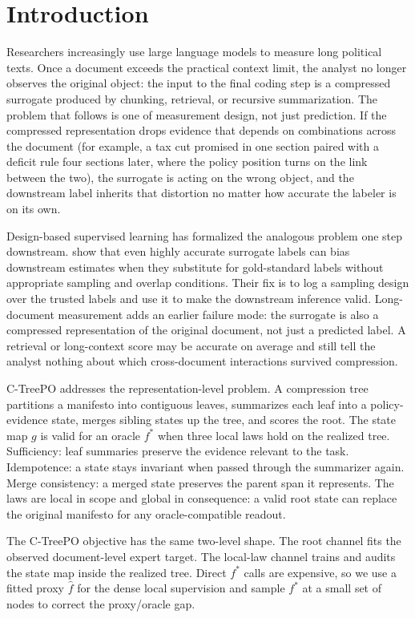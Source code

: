\section{Introduction}\label{sec:v8-introduction}

Researchers increasingly use large language models to measure long
political texts. Once a document exceeds the practical context
limit, the analyst no longer observes the original object: the
input to the final coding step is a compressed surrogate produced by
chunking, retrieval, or recursive summarization. The problem that
follows is one of measurement design, not just prediction. If the
compressed representation drops evidence that depends on combinations
across the document (for example, a tax cut promised in one section
paired with a deficit rule four sections later, where the policy
position turns on the link between the two), the surrogate is acting
on the wrong object, and the downstream label inherits that
distortion no matter how accurate the labeler is on its own.

Design-based supervised learning has formalized the analogous problem
one step downstream. \citet{EgamiEtAl2024} show that even highly
accurate surrogate labels can bias downstream estimates when they
substitute for gold-standard labels without appropriate sampling and
overlap conditions. Their fix is to log a sampling design over the trusted labels and
use it to make the downstream inference valid. Long-document measurement
adds an earlier failure mode: the surrogate is also a compressed
representation of the original document, not just a predicted label.
A retrieval or long-context score may be accurate on average and
still tell the analyst nothing about which cross-document
interactions survived compression.

C-TreePO addresses the representation-level problem. A compression
tree partitions a manifesto into contiguous leaves, summarizes each
leaf into a policy-evidence state, merges sibling states up the tree,
and scores the root. The state map \(g\) is valid for an oracle
\(f^\ast\) when three local laws hold on the realized tree.
Sufficiency: leaf summaries preserve the evidence relevant to the
task. Idempotence: a state stays invariant when passed through the
summarizer again. Merge consistency: a merged state preserves the
parent span it represents. The laws are local in scope and global in
consequence: a valid root state can replace the original manifesto
for any oracle-compatible readout.

The C-TreePO objective has the same two-level shape. The root channel
fits the observed document-level expert target. The local-law channel
trains and audits the state map inside the realized tree. Direct
\(f^\ast\) calls are expensive, so we use a fitted proxy
\(\widehat f\) for the dense local supervision and sample
\(f^\ast\) at a small set of nodes to correct the proxy/oracle gap.

